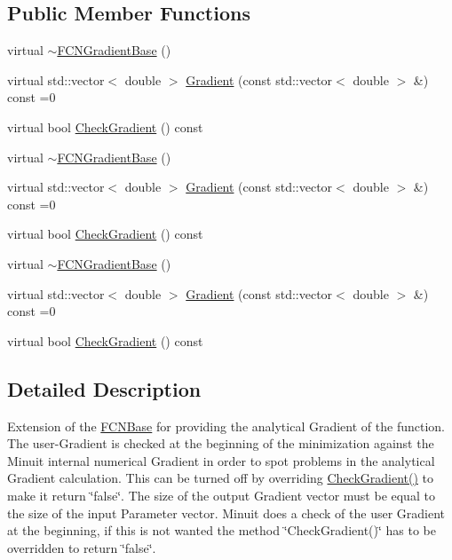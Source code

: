 \subsection*{Public Member Functions}
\begin{DoxyCompactItemize}
\item 
virtual \mbox{\hyperlink{classROOT_1_1Minuit2_1_1FCNGradientBase_a6461fcfe2420af00a55f44c8f683ee25}{$\sim$\+F\+C\+N\+Gradient\+Base}} ()
\item 
virtual std\+::vector$<$ double $>$ \mbox{\hyperlink{classROOT_1_1Minuit2_1_1FCNGradientBase_a004740e7e25a1358aafde6694196ef88}{Gradient}} (const std\+::vector$<$ double $>$ \&) const =0
\item 
virtual bool \mbox{\hyperlink{classROOT_1_1Minuit2_1_1FCNGradientBase_ae69375c7506f0be6a1ab4e4e937ac555}{Check\+Gradient}} () const
\item 
virtual \mbox{\hyperlink{classROOT_1_1Minuit2_1_1FCNGradientBase_a6461fcfe2420af00a55f44c8f683ee25}{$\sim$\+F\+C\+N\+Gradient\+Base}} ()
\item 
virtual std\+::vector$<$ double $>$ \mbox{\hyperlink{classROOT_1_1Minuit2_1_1FCNGradientBase_a004740e7e25a1358aafde6694196ef88}{Gradient}} (const std\+::vector$<$ double $>$ \&) const =0
\item 
virtual bool \mbox{\hyperlink{classROOT_1_1Minuit2_1_1FCNGradientBase_ae69375c7506f0be6a1ab4e4e937ac555}{Check\+Gradient}} () const
\item 
virtual \mbox{\hyperlink{classROOT_1_1Minuit2_1_1FCNGradientBase_a6461fcfe2420af00a55f44c8f683ee25}{$\sim$\+F\+C\+N\+Gradient\+Base}} ()
\item 
virtual std\+::vector$<$ double $>$ \mbox{\hyperlink{classROOT_1_1Minuit2_1_1FCNGradientBase_a004740e7e25a1358aafde6694196ef88}{Gradient}} (const std\+::vector$<$ double $>$ \&) const =0
\item 
virtual bool \mbox{\hyperlink{classROOT_1_1Minuit2_1_1FCNGradientBase_ae69375c7506f0be6a1ab4e4e937ac555}{Check\+Gradient}} () const
\end{DoxyCompactItemize}


\subsection{Detailed Description}
Extension of the \mbox{\hyperlink{classROOT_1_1Minuit2_1_1FCNBase}{F\+C\+N\+Base}} for providing the analytical Gradient of the function. The user-\/\+Gradient is checked at the beginning of the minimization against the Minuit internal numerical Gradient in order to spot problems in the analytical Gradient calculation. This can be turned off by overriding \mbox{\hyperlink{classROOT_1_1Minuit2_1_1FCNGradientBase_ae69375c7506f0be6a1ab4e4e937ac555}{Check\+Gradient()}} to make it return \char`\"{}false\char`\"{}. The size of the output Gradient vector must be equal to the size of the input Parameter vector. Minuit does a check of the user Gradient at the beginning, if this is not wanted the method \char`\"{}\+Check\+Gradient()\char`\"{} has to be overridden to return \char`\"{}false\char`\"{}. 

